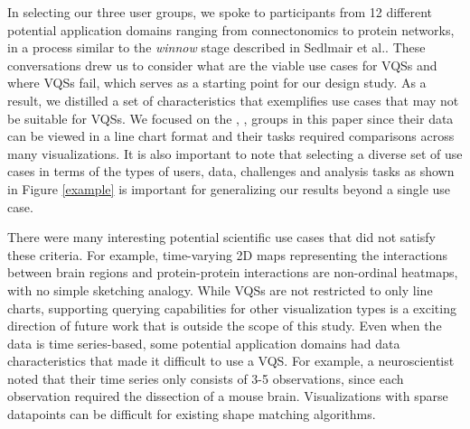 { 
\par In selecting our three user groups, we spoke to participants from 12 different potential application domains ranging from connectonomics to protein networks, in a process similar to the \textit{winnow} stage described in Sedlmair et al.\cite{Sedlmair2012}. These conversations drew us to consider what are the viable use cases for VQSs and where VQSs fail, which serves as a starting point for our design study. As a result, we distilled a set of characteristics that exemplifies use cases that may not be suitable for VQSs. We focused on the \astro, \bio, \matsci groups in this paper since their data can be viewed in a line chart format and their tasks required comparisons across many visualizations. It is also important to note that selecting a diverse set of use cases in terms of the types of users, data, challenges and analysis tasks as shown in Figure \ref{example} is important for generalizing our results beyond a single use case.
\par There were many interesting potential scientific use cases that did not satisfy these criteria. For example, time-varying 2D maps representing the interactions between brain regions and protein-protein interactions are non-ordinal heatmaps, with no simple sketching analogy. While VQSs are not restricted to only line charts, supporting querying capabilities for other visualization types is a exciting direction of future work that is outside the scope of this study. Even when the data is time series-based, some potential application domains had data characteristics that made it difficult to use a VQS. For example, a neuroscientist noted that their time series only consists of 3-5  observations, since each observation required the dissection of a mouse brain. Visualizations with sparse datapoints can be difficult for existing shape matching algorithms.  

}
